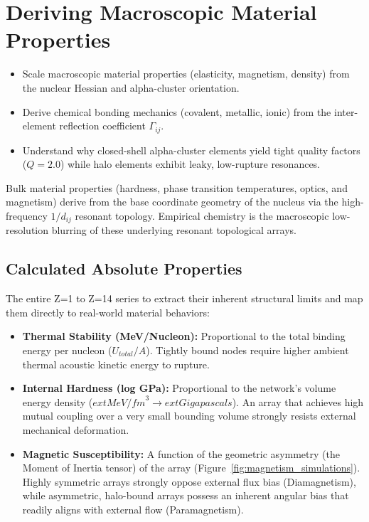 \chapter{Deriving Macroscopic Material Properties}
\label{ch:derived_properties}


\begin{objectivebox}
\begin{itemize}
    \item Scale macroscopic material properties (elasticity, magnetism, density) from the nuclear Hessian and alpha-cluster orientation.
    \item Derive chemical bonding mechanics (covalent, metallic, ionic) from the inter-element reflection coefficient $\Gamma_{ij}$.
    \item Understand why closed-shell alpha-cluster elements yield tight quality factors ($Q=2.0$) while halo elements exhibit leaky, low-rupture resonances.
\end{itemize}
\end{objectivebox}

Bulk material properties (hardness, phase transition temperatures, optics, and magnetism) derive from the base coordinate geometry of the nucleus via the high-frequency $1/d_{ij}$ resonant topology. Empirical chemistry is the macroscopic low-resolution blurring of these underlying resonant topological arrays.

\section{Calculated Absolute Properties}
The entire Z=1 to Z=14 series to extract their inherent structural limits and map them directly to real-world material behaviors:
\begin{itemize}
    \item \textbf{Thermal Stability (MeV/Nucleon):} Proportional to the total binding energy per nucleon ($U_{total} / A$). Tightly bound nodes require higher ambient thermal acoustic kinetic energy to rupture.
    \item \textbf{Internal Hardness (log GPa):} Proportional to the network's volume energy density ($	ext{MeV/fm}^3 \to 	ext{Gigapascals}$). An array that achieves high mutual coupling over a very small bounding volume strongly resists external mechanical deformation.
    \item \textbf{Magnetic Susceptibility:} A function of the geometric asymmetry (the Moment of Inertia tensor) of the array (Figure~\ref{fig:magnetism_simulations}). Highly symmetric arrays strongly oppose external flux bias (Diamagnetism), while asymmetric, halo-bound arrays possess an inherent angular bias that readily aligns with external flow (Paramagnetism).
\end{itemize}

